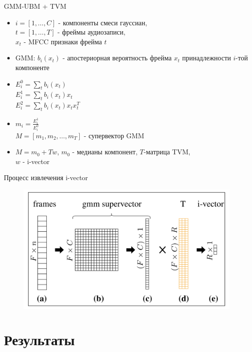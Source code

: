 \documentclass[xcolor=svgnames,handout]{beamer}
\begin{document}
  
\begin{frame}
  {GMM-UBM + TVM}

    \begin{itemize}
    \item $i=[1,\ldots,  C]$ - компоненты смеси гауссиан,\\ $t=[1,\ldots,  T]$ - фреймы аудиозаписи, \\
    $x_t$ - MFCC признаки фрейма $t$
    \item GMM: $b_i(x_t)$ - апостериорная вероятность фрейма $x_t$ принадлежности $i$-той компоненте 
    \item $E_i^0 = \sum\limits_t{b_i(x_t)}$\\
          $E_i^1 = \sum\limits_t{b_i(x_t)x_t}$ \\
          $E_i^2 = \sum\limits_t{b_i(x_t)x_tx_t^T}$
    \item $m_i = \frac{E_i^1}{E_i^0}$ \\
          $M = [m_1, m_2, \ldots, m_T]$ - супервектор GMM
    \item $M = m_0+Tw$, $m_0$ - медианы компонент, $T$-матрица TVM, \\$w$ - i-vector
    \end{itemize}

\end{frame}

  
\begin{frame}
  {Процесс извлечения i-vector}

  \begin{figure}[t]
    \centering
    \includegraphics[width = 0.95\linewidth]{ivector.png}
  \end{figure}
 
 
\end{frame}

\section
  {Результаты}
  
\end{document}
